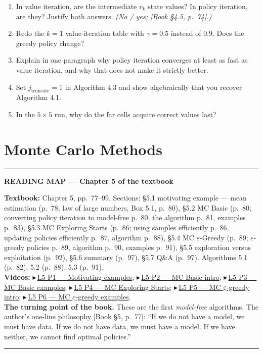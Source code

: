 \documentclass[11pt, letterpaper]{article}
\theoremstyle{runin}
\theoremstyle{runinplain}
\theoremstyle{remark}
\newcommand{\bkin}[1]{{\color{bookblue}\small[\textsf{Book #1}]}}
\newcommand{\vid}[2]{{\color{vidred}\small$\playbutton$\,\href{#2}{\textsf{#1}}}}
\newcommand{\playbutton}{\blacktriangleright}
\newenvironment{roadmap}[1]
  {\par\medskip\noindent\rule{\textwidth}{0.9pt}\par\nobreak\vspace{0.25em}
   \noindent\textbf{\small READING MAP --- #1}\par\nobreak\vspace{0.15em}
   \small}
  {\par\nobreak\vspace{0.25em}\noindent\rule{\textwidth}{0.9pt}\par\medskip}
\begin{document}
\begin{enumerate}
  \item In value iteration, are the intermediate $v_k$ state values? In policy
        iteration, are they? Justify both answers.
        \emph{(No / yes; \bkin{\S4.5, p.~74}.)}
  \item Redo the $k=1$ value-iteration table with $\gamma=0.5$ instead of $0.9$.
        Does the greedy policy change?
  \item Explain in one paragraph why policy iteration converges at least as fast as
        value iteration, and why that does not make it strictly better.
  \item Set $j_{\text{truncate}}=1$ in Algorithm 4.3 and show algebraically that you
        recover Algorithm 4.1.
  \item In the $5\times5$ run, why do the far cells acquire correct values last?
\end{enumerate}

\newpage
\section{Monte Carlo Methods}

\begin{roadmap}{Chapter 5 of the textbook}
\textbf{Textbook:} Chapter 5, pp.~77--99. Sections: \S5.1 motivating example ---
mean estimation (p.~78; law of large numbers, Box 5.1, p.~80), \S5.2 MC Basic
(p.~80; converting policy iteration to model-free p.~80, the algorithm p.~81,
examples p.~83), \S5.3 MC Exploring Starts (p.~86; using samples efficiently p.~86,
updating policies efficiently p.~87, algorithm p.~88), \S5.4 MC $\varepsilon$-Greedy
(p.~89; $\varepsilon$-greedy policies p.~89, algorithm p.~90, examples p.~91),
\S5.5 exploration versus exploitation (p.~92), \S5.6 summary (p.~97), \S5.7 Q\&A
(p.~97). Algorithms 5.1 (p.~82), 5.2 (p.~88), 5.3 (p.~91).\\[0.3em]
\textbf{Videos:}
\vid{L5 P1 --- Motivating examples}{https://www.youtube.com/watch?v=DO1yXinAV_Q};
\vid{L5 P2 --- MC Basic intro}{https://www.youtube.com/watch?v=6ShisunU0zs};
\vid{L5 P3 --- MC Basic examples}{https://www.youtube.com/watch?v=axA0yns9FxU};
\vid{L5 P4 --- MC Exploring Starts}{https://www.youtube.com/watch?v=Qt8OMHPkLqg};
\vid{L5 P5 --- MC $\varepsilon$-greedy intro}{https://www.youtube.com/watch?v=dM3fYE630pY};
\vid{L5 P6 --- MC $\varepsilon$-greedy examples}{https://www.youtube.com/watch?v=x6X_5ePT9gQ}.\\[0.3em]
\textbf{The turning point of the book.} These are the first \emph{model-free}
algorithms. The author's one-line philosophy \bkin{\S5, p.~77}: ``If we do not have
a model, we must have data. If we do not have data, we must have a model. If we
have neither, we cannot find optimal policies.''
\end{roadmap}
\end{document}
